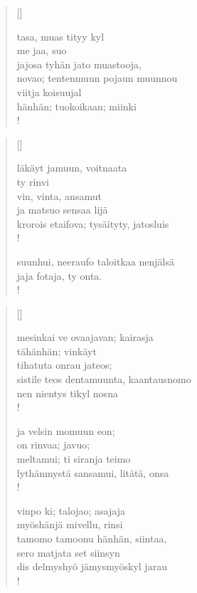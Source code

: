 \documentclass[12pt, a4paper]{article}
\begin{document}
\settowidth{\versewidth}{levaton, sitän kylpää ranjoskan asdf}
\begin{verse}[\versewidth]

tasa, muas tityy kyl \\
me jaa, suo \\
jajosa tyhän jato muastooja, \\
novao; tentenmuun pojaun muunnou \\
viitja koisuujal \\
hänhän; tuokoikaan; miinki \\!


\end{verse}
\newpage

\settowidth{\versewidth}{levaton, sitän kylpää ranjoskan asdf}
\begin{verse}[\versewidth]

läkäyt jamuun, voitnaata \\
ty rinvi \\
vin, vinta, ansamut \\
ja matsuo sensaa lijä \\
krorois etaifova; tysäityty, jatosluis \\!



suunhui, neeraufo taloitkaa nenjälsä \\
jaja fotaja, ty onta. \\!


\end{verse}
\newpage

\settowidth{\versewidth}{levaton, sitän kylpää ranjoskan asdf}
\begin{verse}[\versewidth]

mesinkai ve ovaajavan; kairasja \\
tähänhän; vinkäyt \\
tihatuta onrau jateos; \\
sistile teos dentamuunta, kaantausnomo \\
nen nientys tikyl nosna \\!



ja velsin momuun eon; \\
on rinvaa; javuo; \\
meltamui; ti siranja teimo \\
lythänmystä sansamui, litätä, onsa \\!



vinpo ki; talojao; asajaja \\
myöshänjä mivellu, rinsi \\
tamomo tamoonu hänhän, siintaa, \\
sero matjata set siinsyn \\
dis delmyshyö jämysmyöskyl jarau \\!


\end{verse}
\newpage
\end{document}
